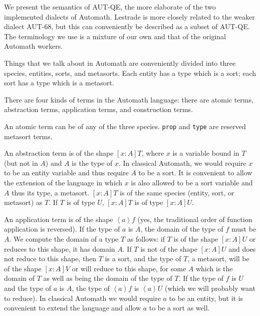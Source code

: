 \documentclass{article}
\begin{document}
We present the semantics of AUT-QE, the more elaborate of the two implemented dialects of Automath.  Lestrade is more closely related to the weaker dialect AUT-68, but this can conveniently be described as a subset of AUT-QE.  The terminology we use is a mixture of our own and that of the original Automath workers.

Things that we talk about in Automath are conveniently divided into three species, entities, sorts, and metasorts.  Each entity has a type which is a sort;  each sort has a type which is a metasort.

There are four kinds of terms in the Automath language:  there are atomic terms, abstraction terms, application terms, and construction terms.

An atomic term can be of any of the three species.  {\tt prop} and {\tt type} are reserved metasort terms.

An abstraction term is of the shape $[x:A]T$, where $x$ is a variable bound in $T$ (but not in $A$) and $A$ is the type of $x$.  In classical Automath, we would require $x$ to be an entity variable and thus require $A$ to be a sort.  It is convenient to allow the extension of the language in which $x$ is also allowed to be a sort variable and $A$ thus its type, a metasort.  $[x:A]T$ is of the same species (entity, sort, or metasort) as $T$.  If $T$ is of type $U$,
$[x:A]T$ is of type $[x:A]U$.

An application term is of the shape $\left<a\right>f$ (yes, the traditional order of function application is reversed).  If the type of $a$ is $A$, the domain of the type of $f$ must be $A$.  We compute the domain
of a type $T$ as follows:  if $T$ is of the shape $[x:A]U$ or reduces to this shape, it has domain $A$.  If $T$ is not of the shape $[x:A]U$ and does not reduce to this shape, then $T$ is a sort, and the type of $T$, a metasort, will be of the shape $[x:A]V$ or will reduce to this shape, for some $A$ which is the domain of $T$ as well as being the domain of the type of $T$.  If the type of $f$ is $U$ and the type of $a$ is $A$, the type of $\left<a\right>f$ is $\left<a\right>U$ (which we will probably want to reduce).  In classical Automath we would require $a$ to be an entity, but it is convenient to extend the language and allow $a$ to be a sort as well.
\end{document}
